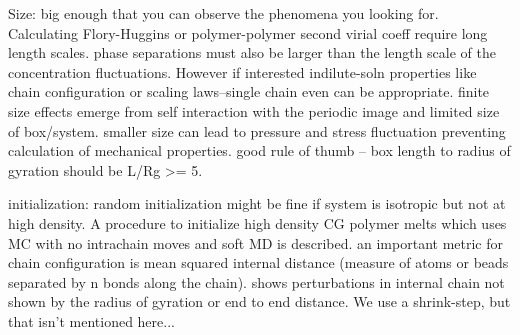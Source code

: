 \documentclass{article}
\begin{document}
Size: big enough that you can observe the phenomena you looking for. Calculating Flory-Huggins or polymer-polymer second virial coeff require long length scales. phase separations must also be larger than the length scale of the concentration fluctuations. However if interested indilute-soln properties like chain configuration or scaling laws--single chain even can be appropriate.
finite size effects emerge from self interaction with the periodic image and limited size of box/system. smaller size can lead to pressure and stress fluctuation preventing calculation of mechanical properties.
good rule of thumb -- box length to radius of gyration should be L/Rg >= 5.

initialization: random initialization might be fine if system is isotropic but not at high density. A procedure to initialize high density CG polymer melts which uses MC with no intrachain moves and soft MD is described.
an important metric for chain configuration is mean squared internal distance (measure of atoms or beads separated by n bonds along the chain). shows perturbations in internal chain not shown by the radius of gyration or end to end distance.
We use a shrink-step, but that isn't mentioned here...
\end{document}
